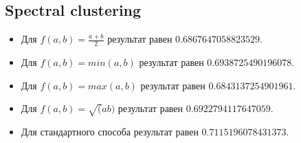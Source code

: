 \subsection{Spectral clustering}
\begin{itemize}
\item Для $f(a, b) = \frac{a + b}{2}$ результат равен $0.6867647058823529$.
\item Для $f(a, b) = min(a, b)$ результат равен $0.6938725490196078$.
\item Для $f(a, b) = max(a, b)$ результат равен $0.6843137254901961$.
\item Для $f(a, b) = \sqrt(ab)$ результат равен $0.6922794117647059$.
\item Для стандартного способа результат равен $0.7115196078431373$.
\end{itemize}
